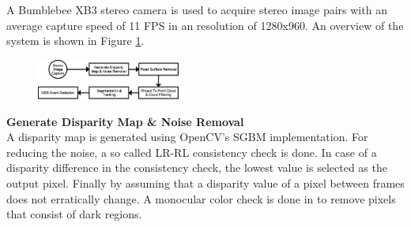 \begin{multicols}{2}   

A Bumblebee XB3 stereo camera is used to acquire stereo image pairs with an average capture speed of 11 FPS in an resolution of 1280x960.  An overview of the system is shown in Figure \ref{systemOverview::systemOverview}.

\begin{figure}[H]
  \centering
  \includegraphics[width=0.42\textwidth]{text/figures/systemForeslag4.png}
  \label{systemOverview::systemOverview}
\end{figure}


\textbf{Generate Disparity Map \& Noise Removal}\\
A disparity map is generated using OpenCV's SGBM implementation. For reducing the noise, a so called LR-RL consistency check is done. %
In case of a disparity difference in the consistency check, the lowest value is selected as the output pixel. Finally by assuming that a disparity value of a pixel between frames does not erratically change. A monocular color check is done in to remove pixels that consist of dark regions.
%
%


\end{multicols}
